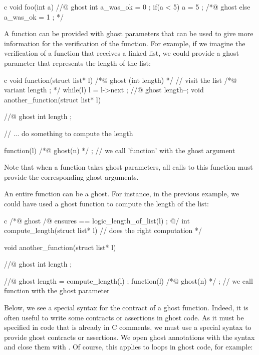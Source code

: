 \begin{CodeBlock}{c}
void foo(int a){
  //@ ghost int a_was_ok = 0 ;
  if(a < 5){
    a = 5 ;
  } /*@ ghost else {
    a_was_ok = 1 ;
  } */
}
\end{CodeBlock}


A function can be provided with ghost parameters that can be used
to give more information for the verification of the function. For
example, if we imagine the verification of a function that receives
a linked list, we could provide a ghost parameter that represents
the length of the list:


\begin{CodeBlock}{c}
void function(struct list* l) /*@ ghost (int length) */ {
  // visit the list
  /*@ variant length ; */
  while(l){
    l = l->next ;
    //@ ghost length--;
  }
}
void another_function(struct list* l){
  //@ ghost int length ;

  // ... do something to compute the length

  function(l) /*@ ghost(n) */ ; // we call 'function' with the ghost argument
}
\end{CodeBlock}


Note that when a function takes ghost parameters, all calls to this
function must provide the corresponding ghost arguments.


An entire function can be a ghost. For instance, in the previous example, we
could have used a ghost function to compute the length of the list:


\begin{CodeBlock}{c}
/*@ ghost
  /@ ensures \result == logic_length_of_list(l) ; @/
  int compute_length(struct list* l){
    // does the right computation
  }
*/

void another_function(struct list* l){
  //@ ghost int length ;

  //@ ghost length = compute_length(l) ;
  function(l) /*@ ghost(n) */ ; // we call function with the ghost parameter
}
\end{CodeBlock}


Below, we see a special syntax for the contract of a ghost function.
Indeed, it is often useful to write some contracts or assertions in ghost
code. As it must be specified in code that is already in C comments, we
must use a special syntax to provide ghost contracts or assertions.
We open ghost annotations with the syntax  and close
them with . Of course, this applies to loops in ghost code,
for example:


